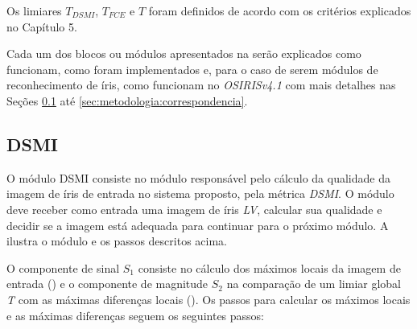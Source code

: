 \par Os limiares $T_{DSMI}$, $T_{FCE}$ e $T$ foram definidos de acordo com os critérios explicados no Capítulo 5.

\par Cada um dos blocos ou módulos apresentados na  serão explicados como funcionam, como foram implementados e, para o caso de serem módulos de reconhecimento de íris, como funcionam no \textit{OSIRISv4.1} com mais detalhes nas Seções \ref{sec:metodologia:dsmi} até \ref{sec:metodologia:correspondencia}.

\subsection{DSMI}\label{sec:metodologia:dsmi}

\par O módulo \acrshort{DSMI} consiste no módulo responsável pelo cálculo da qualidade da imagem de íris de entrada no sistema proposto, pela métrica \textit{\acrshort{DSMI}}. O módulo deve receber como entrada uma imagem de íris \textit{\acrshort{LV}}, calcular sua qualidade e decidir se a imagem está adequada para continuar para o próximo módulo. A  ilustra o módulo e os passos descritos acima.



\par O componente de sinal $S_{1}$ consiste no cálculo dos máximos locais da imagem de entrada () e o componente de magnitude $S_{2}$ na comparação de um limiar global \textit{T} com as máximas diferenças locais (). Os passos para calcular os máximos locais e as máximas diferenças seguem os seguintes passos:


